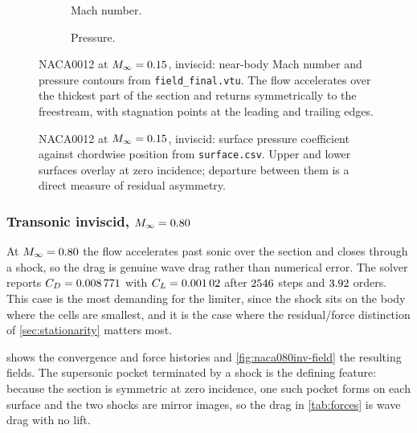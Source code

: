 \begin{figure}[htbp]
  \centering
  \begin{subfigure}{0.49\textwidth}\centering
    \caption{Mach number.}
  \end{subfigure}\hfill
  \begin{subfigure}{0.49\textwidth}\centering
    \caption{Pressure.}
  \end{subfigure}
  \caption{NACA0012 at $M_\infty=0.15$, inviscid: near-body Mach number and
  pressure contours from \texttt{field\_final.vtu}. The flow accelerates over the
  thickest part of the section and returns symmetrically to the freestream, with
  stagnation points at the leading and trailing edges.}
  \label{fig:naca015inv-field}
\end{figure}

\begin{figure}[htbp]
  \centering
  \caption{NACA0012 at $M_\infty=0.15$, inviscid: surface pressure coefficient
  against chordwise position from \texttt{surface.csv}. Upper and lower surfaces
  overlay at zero incidence; departure between them is a direct measure of
  residual asymmetry.}
  \label{fig:naca015inv-cp}
\end{figure}

\subsubsection{Transonic inviscid, $M_\infty=0.80$}

At $M_\infty=0.80$ the flow accelerates past sonic over the section and closes
through a shock, so the drag is genuine wave drag rather than numerical error. The
solver reports $C_D=\num{0.008771}$ with $C_L=\num{0.00102}$ after
$\num{2546}$ steps and $\num{3.92}$ orders. This case is the
most demanding for the limiter, since the shock sits on the body where the cells
are smallest, and it is the case where the residual/force distinction of
\cref{sec:stationarity} matters most.

 shows the convergence and force histories and
\cref{fig:naca080inv-field} the resulting fields. The supersonic pocket
terminated by a shock is the defining feature: because the section is symmetric
at zero incidence, one such pocket forms on each surface and the two shocks are
mirror images, so the drag in \cref{tab:forces} is wave drag with no lift.

